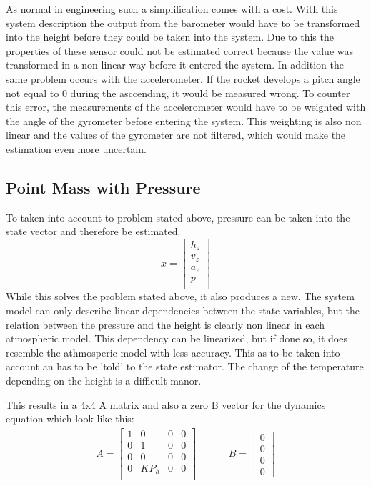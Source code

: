   As normal in engineering such a simplification comes with a cost. With this system description the output from the barometer would have
  to be transformed into the height before they could be taken into the system. 
  Due to this the properties of these sensor could not be estimated correct because the value was transformed in a non linear way before it entered the system.
  In addition the same problem occurs with the accelerometer. If the rocket develops a pitch angle not equal to 0 during the asccending, it would be measured wrong.
  To counter this error, the measurements of the accelerometer would have to be weighted with the angle of the gyrometer before entering the system.
  This weighting is also non linear and the values of the gyrometer are not filtered, which would make the estimation even more uncertain.
  
  \subsection{Point Mass with Pressure}
  To taken into account to problem stated above, pressure can be taken into the state vector and therefore be estimated.
  $$ x = \begin{bmatrix}
  h_z\\
  v_z\\
  a_z\\
  p\\
  \end{bmatrix} $$ 
  While this solves the problem stated above, it also produces a new. The system model can only describe linear dependencies between the state variables,
  but the relation between the pressure and the height is clearly non linear in each atmospheric model.
  This dependency can be linearized, but if done so, it does resemble the athmosperic model with less accuracy.
  This as to be taken into account an has to be 'told' to the state estimator.
  The change of the temperature depending on the height is a difficult manor.
  
  This results in a 4x4 A matrix and also a zero B vector for the dynamics equation which look like this:
  \begin{align*}
  A = \begin{bmatrix}
         1    & 0 & 0 & 0    \\
         0    & 1 & 0 & 0    \\
         0    & 0 & 0 & 0    \\
         0    & KP_h & 0 & 0\\
        \end{bmatrix}
        & \hspace{1cm}
    B = \begin{bmatrix}
       0 \\
       0 \\
       0 \\
       0
      \end{bmatrix}
  \end{align*}  
  
